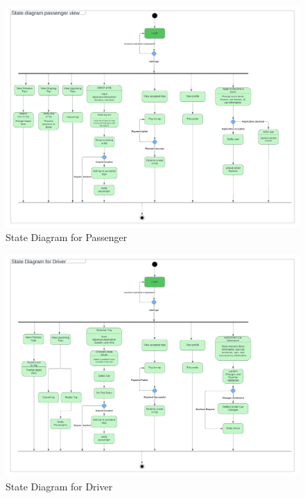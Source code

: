 \documentclass[a4paper, 12pt]{article} %
\begin{document}
        \begin{figure}
            \centering
            \includegraphics[width=\linewidth]{Images/State Diagram passenger.png}
            \caption{State Diagram for Passenger}
            \label{fig:state_passenger}
        \end{figure}

       \begin{figure}
            \centering
            \includegraphics[width=\linewidth]{Images/State Diagram Driver.png}
            \caption{State Diagram for Driver}
            \label{fig:state_driver}
        \end{figure}
\end{document}
